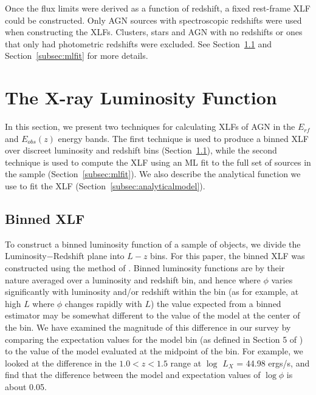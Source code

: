 \documentclass[fleqn,usenatbib]{mnras}
\begin{document}
    Once the flux limits were derived as a function of redshift, a fixed rest-frame XLF could be constructed. 
    Only AGN sources with spectroscopic redshifts were used when constructing the XLFs. 
    Clusters, stars and AGN with no redshifts or ones that only had photometric redshifts were excluded.
    See Section~\ref{subsec:binnedxlf} and Section~\ref{subsec:mlfit} for more details.
    
    	

\section{The X-ray Luminosity Function}\label{sec:xlfmethod}

In this section, we present two techniques for calculating XLFs of AGN in the $E_{rf}$ and $E_{obs}(z)$ energy bands. 
The first technique is used to produce a binned XLF over discreet luminosity and redshift bins (Section~\ref{subsec:binnedxlf}), while the second technique is used to compute the XLF using an ML fit to the full set of sources in the sample (Section~\ref{subsec:mlfit}). 
We also describe the analytical function we use to fit the XLF (Section~\ref{subsec:analyticalmodel}).
	
	
	\subsection{Binned XLF}\label{subsec:binnedxlf}  
	
	To construct a binned luminosity function of a sample of objects, we divide the Luminosity$-$Redshift plane into $L-z$ bins. 
	For this paper, the binned XLF was constructed using the method of \cite{page2000improved}.
	Binned luminosity functions are by their nature averaged over a luminosity and redshift bin, and hence where $\phi$ varies significantly with luminosity and/or redshift within the bin (as for example, at high $L$ where $\phi$ changes rapidly with $L$) the value expected from a binned estimator may be somewhat different to the value of the model at the center of the bin. 
	We have examined the magnitude of this difference in our survey by comparing the expectation values for the model bin (as defined in Section 5 of \cite{page2000improved}) to the value of the model evaluated at the midpoint of the bin. 
        For example, we looked at the difference in the $1.0 < z < 1.5$ range at $\log$ $L_X$ = 44.98 ergs/s, and find that the difference between the model and expectation values of $\log \phi$ is about 0.05.
		
\end{document}
